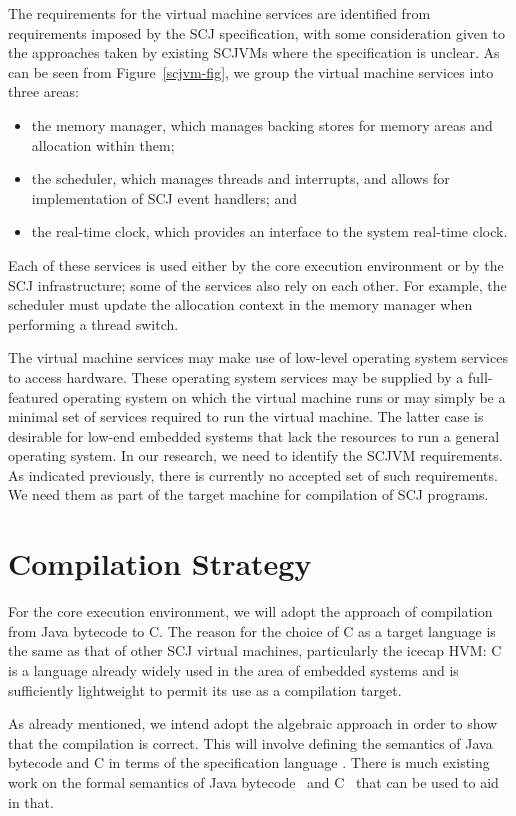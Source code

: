 \documentclass[a4paper,10pt]{report}
\begin{document}
The requirements for the virtual machine services are identified from
requirements imposed by the SCJ specification, with some consideration
given to the approaches taken by existing SCJVMs where the
specification is unclear.
As can be seen from Figure~\ref{scjvm-fig}, we group the virtual
machine services into three areas:
\begin{itemize}
\item the memory manager, which manages backing stores for memory
  areas and allocation within them;
\item the scheduler, which manages threads and interrupts, and allows
  for implementation of SCJ event handlers; and
\item the real-time clock, which provides an interface to the system
  real-time clock.
\end{itemize}
Each of these services is used either by the core execution
environment or by the SCJ infrastructure; some of the services also
rely on each other.
For example, the scheduler must update the allocation context in the
memory manager when performing a thread switch.

The virtual machine services may make use of low-level operating
system services to access hardware.
These operating system services may be supplied by a full-featured
operating system on which the virtual machine runs or may simply be a
minimal set of services required to run the virtual machine.
The latter case is desirable for low-end embedded systems that lack
the resources to run a general operating system.
In our research, we need to identify the SCJVM requirements.
As indicated previously, there is currently no accepted set of such
requirements.
We need them as part of the target machine for compilation of SCJ
programs.

\section{Compilation Strategy}

For the core execution environment, we will adopt the approach of
compilation from Java bytecode to C.
The reason for the choice of C as a target language is the same as
that of other SCJ virtual machines, particularly the icecap HVM: C is
a language already widely used in the area of embedded systems and is
sufficiently lightweight to permit its use as a compilation target.

As already mentioned, we intend adopt the algebraic approach in order
to show that the compilation is correct.
This will involve defining the semantics of Java bytecode and C in
terms of the specification language \Circus{}.
There is much existing work on the formal semantics of Java
bytecode~\cite{bertelsen2000, jones1998, stark2001, alves1999a,
  bogdanas2015, lochbihler2012a} and C~\cite{campbell2012,
  ellison2012, krebbers2014} that can be used to aid in that.
\end{document}
